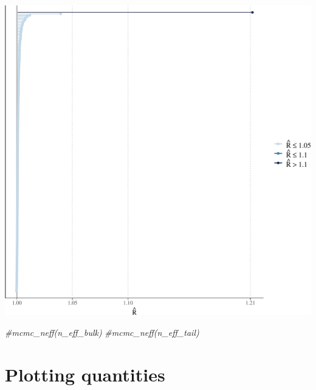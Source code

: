 \documentclass[
]{book}
\newenvironment{Shaded}{\begin{snugshade}}{\end{snugshade}}
\newcommand{\CommentTok}[1]{\textcolor[rgb]{0.56,0.35,0.01}{\textit{#1}}}
\begin{document}
\includegraphics{_main_files/figure-latex/plot_rhats-1.pdf}

\begin{Shaded}
\begin{Highlighting}[]
\CommentTok{\#mcmc\_neff(n\_eff\_bulk)}
\CommentTok{\#mcmc\_neff(n\_eff\_tail)}
\end{Highlighting}
\end{Shaded}

\hypertarget{plotting-quantities}{%
\section{Plotting quantities}\label{plotting-quantities}}
\end{document}

